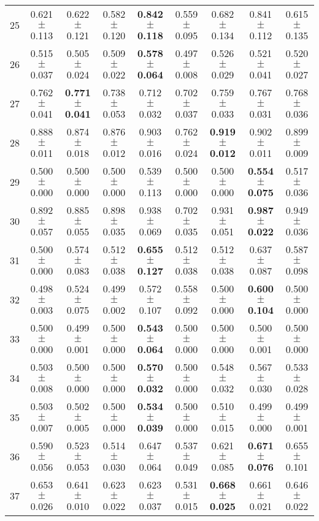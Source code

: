 \begin{table}[!ht]
{\begin{tabular}{r c c c c c c c c}
25 & 0.621 $\pm$ 0.113 & 0.622 $\pm$ 0.121 & 0.582 $\pm$ 0.120 & \textbf{0.842 $\pm$ 0.118} & 0.559 $\pm$ 0.095 & 0.682 $\pm$ 0.134 & 0.841 $\pm$ 0.112 & 0.615 $\pm$ 0.135 \\
26 & 0.515 $\pm$ 0.037 & 0.505 $\pm$ 0.024 & 0.509 $\pm$ 0.022 & \textbf{0.578 $\pm$ 0.064} & 0.497 $\pm$ 0.008 & 0.526 $\pm$ 0.029 & 0.521 $\pm$ 0.041 & 0.520 $\pm$ 0.027 \\
27 & 0.762 $\pm$ 0.041 & \textbf{0.771 $\pm$ 0.041} & 0.738 $\pm$ 0.053 & 0.712 $\pm$ 0.032 & 0.702 $\pm$ 0.037 & 0.759 $\pm$ 0.033 & 0.767 $\pm$ 0.031 & 0.768 $\pm$ 0.036 \\
28 & 0.888 $\pm$ 0.011 & 0.874 $\pm$ 0.018 & 0.876 $\pm$ 0.012 & 0.903 $\pm$ 0.016 & 0.762 $\pm$ 0.024 & \textbf{0.919 $\pm$ 0.012} & 0.902 $\pm$ 0.011 & 0.899 $\pm$ 0.009 \\
29 & 0.500 $\pm$ 0.000 & 0.500 $\pm$ 0.000 & 0.500 $\pm$ 0.000 & 0.539 $\pm$ 0.113 & 0.500 $\pm$ 0.000 & 0.500 $\pm$ 0.000 & \textbf{0.554 $\pm$ 0.075} & 0.517 $\pm$ 0.036 \\
30 & 0.892 $\pm$ 0.057 & 0.885 $\pm$ 0.055 & 0.898 $\pm$ 0.035 & 0.938 $\pm$ 0.069 & 0.702 $\pm$ 0.035 & 0.931 $\pm$ 0.051 & \textbf{0.987 $\pm$ 0.022} & 0.949 $\pm$ 0.036 \\
31 & 0.500 $\pm$ 0.000 & 0.574 $\pm$ 0.083 & 0.512 $\pm$ 0.038 & \textbf{0.655 $\pm$ 0.127} & 0.512 $\pm$ 0.038 & 0.512 $\pm$ 0.038 & 0.637 $\pm$ 0.087 & 0.587 $\pm$ 0.098 \\
32 & 0.498 $\pm$ 0.003 & 0.524 $\pm$ 0.075 & 0.499 $\pm$ 0.002 & 0.572 $\pm$ 0.107 & 0.558 $\pm$ 0.092 & 0.500 $\pm$ 0.000 & \textbf{0.600 $\pm$ 0.104} & 0.500 $\pm$ 0.000 \\
33 & 0.500 $\pm$ 0.000 & 0.499 $\pm$ 0.001 & 0.500 $\pm$ 0.000 & \textbf{0.543 $\pm$ 0.064} & 0.500 $\pm$ 0.000 & 0.500 $\pm$ 0.000 & 0.500 $\pm$ 0.001 & 0.500 $\pm$ 0.000 \\
34 & 0.503 $\pm$ 0.008 & 0.500 $\pm$ 0.000 & 0.500 $\pm$ 0.000 & \textbf{0.570 $\pm$ 0.032} & 0.500 $\pm$ 0.000 & 0.548 $\pm$ 0.032 & 0.567 $\pm$ 0.030 & 0.533 $\pm$ 0.028 \\
35 & 0.503 $\pm$ 0.007 & 0.502 $\pm$ 0.005 & 0.500 $\pm$ 0.000 & \textbf{0.534 $\pm$ 0.039} & 0.500 $\pm$ 0.000 & 0.510 $\pm$ 0.015 & 0.499 $\pm$ 0.000 & 0.499 $\pm$ 0.001 \\
36 & 0.590 $\pm$ 0.056 & 0.523 $\pm$ 0.053 & 0.514 $\pm$ 0.030 & 0.647 $\pm$ 0.064 & 0.537 $\pm$ 0.049 & 0.621 $\pm$ 0.085 & \textbf{0.671 $\pm$ 0.076} & 0.655 $\pm$ 0.101 \\
37 & 0.653 $\pm$ 0.026 & 0.641 $\pm$ 0.010 & 0.623 $\pm$ 0.022 & 0.623 $\pm$ 0.037 & 0.531 $\pm$ 0.015 & \textbf{0.668 $\pm$ 0.025} & 0.661 $\pm$ 0.021 & 0.646 $\pm$ 0.022 \\

\end{tabular}}
\end{table}

